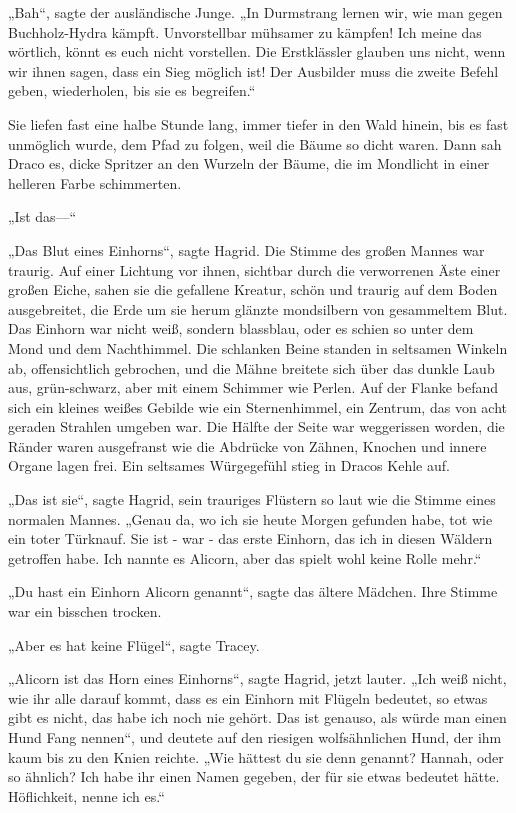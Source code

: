 {„Bah“, sagte der ausländische Junge. „In Durmstrang lernen wir, wie man gegen Buchholz-Hydra kämpft. Unvorstellbar mühsamer zu kämpfen! Ich meine das wörtlich, könnt es euch nicht vorstellen. Die Erstklässler glauben uns nicht, wenn wir ihnen sagen, dass ein Sieg möglich ist! Der Ausbilder muss die zweite Befehl geben, wiederholen, bis sie es begreifen.“

Sie liefen fast eine halbe Stunde lang, immer tiefer in den Wald hinein, bis es fast unmöglich wurde, dem Pfad zu folgen, weil die Bäume so dicht waren. Dann sah Draco es, dicke Spritzer an den Wurzeln der Bäume, die im Mondlicht in einer helleren Farbe schimmerten.

„Ist das—“

„Das Blut eines Einhorns“, sagte Hagrid. Die Stimme des großen Mannes war traurig. Auf einer Lichtung vor ihnen, sichtbar durch die verworrenen Äste einer großen Eiche, sahen sie die gefallene Kreatur, schön und traurig auf dem Boden ausgebreitet, die Erde um sie herum glänzte mondsilbern von gesammeltem Blut. Das Einhorn war nicht weiß, sondern blassblau, oder es schien so unter dem Mond und dem Nachthimmel. Die schlanken Beine standen in seltsamen Winkeln ab, offensichtlich gebrochen, und die Mähne breitete sich über das dunkle Laub aus, grün-schwarz, aber mit einem Schimmer wie Perlen. Auf der Flanke befand sich ein kleines weißes Gebilde wie ein Sternenhimmel, ein Zentrum, das von acht geraden Strahlen umgeben war. Die Hälfte der Seite war weggerissen worden, die Ränder waren ausgefranst wie die Abdrücke von Zähnen, Knochen und innere Organe lagen frei. Ein seltsames Würgegefühl stieg in Dracos Kehle auf.

„Das ist sie“, sagte Hagrid, sein trauriges Flüstern so laut wie die Stimme eines normalen Mannes. „Genau da, wo ich sie heute Morgen gefunden habe, tot wie ein toter Türknauf. Sie ist - war - das erste Einhorn, das ich in diesen Wäldern getroffen habe. Ich nannte es Alicorn, aber das spielt wohl keine Rolle mehr.“

„Du hast ein Einhorn Alicorn genannt“, sagte das ältere Mädchen. Ihre Stimme war ein bisschen trocken.

„Aber es hat keine Flügel“, sagte Tracey.

„Alicorn ist das Horn eines Einhorns“, sagte Hagrid, jetzt lauter. „Ich weiß nicht, wie ihr alle darauf kommt, dass es ein Einhorn mit Flügeln bedeutet, so etwas gibt es nicht, das habe ich noch nie gehört. Das ist genauso, als würde man einen Hund Fang nennen“, und deutete auf den riesigen wolfsähnlichen Hund, der ihm kaum bis zu den Knien reichte. „Wie hättest du sie denn genannt? Hannah, oder so ähnlich? Ich habe ihr einen Namen gegeben, der für sie etwas bedeutet hätte. Höflichkeit, nenne ich es.“

}
